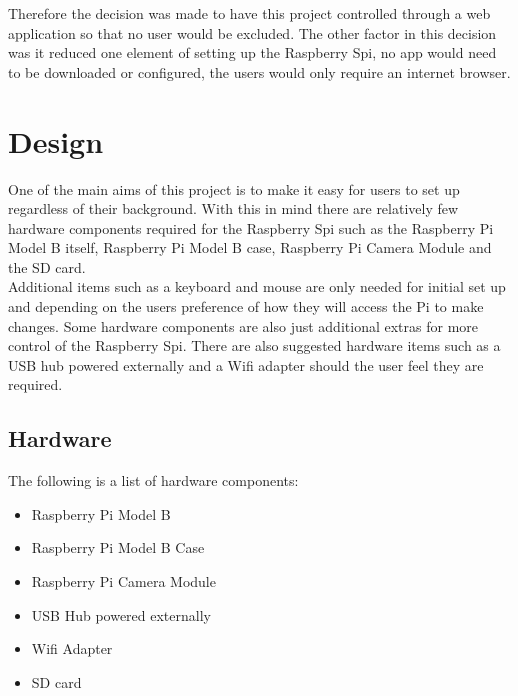 \documentclass[12pt]{report}
\begin{document}
Therefore the decision was made to have this project controlled through a web application so that no user would be excluded. The other factor in this decision was it reduced one element of setting up the Raspberry Spi, no app would need to be downloaded or configured, the users would only require an internet browser.\\

% 
\chapter{Design}
\label{ch:design}
	One of the main aims of this project is to make it easy for users to set up regardless of their background. With this in mind there are relatively few hardware components required for the Raspberry Spi such as the Raspberry Pi Model B itself, Raspberry Pi Model B case, Raspberry Pi Camera Module and the SD card.\\
	 
Additional items such as a keyboard and mouse are only needed for initial set up and depending on the users preference of how they will access the Pi to make changes. Some hardware components are also just additional extras for more control of the Raspberry Spi. There are also suggested hardware items such as a USB hub powered externally and a Wifi adapter should the user feel they are required.\\


\section{Hardware}	
\label{sec:hardware}

The following is a list of hardware components:\\
\begin{itemize}
  \item Raspberry Pi Model B\\
  \item Raspberry Pi Model B Case\\
  \item Raspberry Pi Camera Module\\
  \item USB Hub powered externally\\
  \item Wifi Adapter\\
  \item SD card\\
\end{itemize} 
\end{document}

